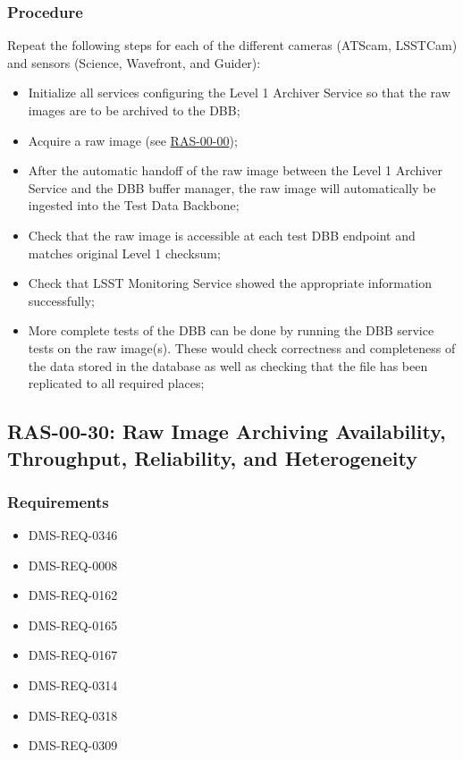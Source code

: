 \documentclass[DM,lsstdraft,STS,toc]{lsstdoc}
\begin{document}
\subsubsection{Procedure}
Repeat the following steps for each of the different cameras (ATScam, LSSTCam) and sensors (Science, Wavefront, and Guider):
\begin{itemize}
\item{Initialize all services configuring the Level 1 Archiver Service so that the raw images are to be archived to the DBB;}
\item{Acquire a raw image (see \hyperref[ras-00-00]{RAS-00-00});}
\item{After the automatic handoff of the raw image between the Level 1 Archiver Service and the DBB buffer manager, the raw
image will automatically be ingested into the Test Data Backbone;}
\item{Check that the raw image is accessible at each test DBB endpoint and matches original Level 1 checksum;}
\item{Check that LSST Monitoring Service showed the appropriate information successfully;}
\item{More complete tests of the DBB can be done by running the DBB
service tests on the raw image(s). These would check correctness
and completeness of the data stored in the database as well as
checking that the file has been replicated to all required places;}
\end{itemize}


\subsection{RAS-00-30: Raw Image Archiving Availability, Throughput, Reliability, and Heterogeneity}
\label{ras-00-30}

\subsubsection{Requirements}
\begin{itemize}
\item{DMS-REQ-0346}
\item{DMS-REQ-0008}
\item{DMS-REQ-0162}
\item{DMS-REQ-0165}
\item{DMS-REQ-0167}
\item{DMS-REQ-0314}
\item{DMS-REQ-0318}
\item{DMS-REQ-0309}
\end{itemize}
\end{document}
